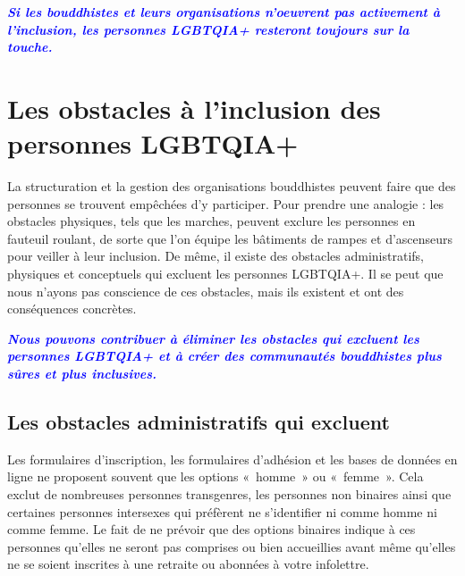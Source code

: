 \documentclass[12pt,openany]{book}
\renewenvironment{quote}{%
  \list{}{%
    \leftmargin-0.1cm   %
    \rightmargin\leftmargin
  }
  \item\relax
}
{\endlist}
\begin{document}
\begin{quote}
\centering
\doublespacing
\textit{\Large \textcolor{blue}{\textbf{Si les bouddhistes et leurs organisations n’oeuvrent pas activement à l’inclusion, les personnes \mbox{LGBTQIA+} resteront toujours sur la touche.}}}
\end{quote}

\chapter*{Les obstacles à l’inclusion des personnes \mbox{LGBTQIA+}}

La structuration et la gestion des organisations bouddhistes peuvent faire que des personnes se trouvent empêchées d’y participer. Pour prendre une analogie : les obstacles physiques, tels que les marches, peuvent exclure les personnes en fauteuil roulant, de sorte que l’on équipe les bâtiments de rampes et d’ascenseurs pour veiller à leur inclusion. De même, il existe des obstacles administratifs, physiques et conceptuels qui excluent les personnes \mbox{LGBTQIA+}. Il se peut que nous n’ayons pas conscience de ces obstacles, mais ils existent et ont des conséquences concrètes.

\begingroup
\begin{quote}
\doublespacing
\centering
\textit{\Large \textbf{\textcolor{blue}{Nous pouvons contribuer à éliminer les obstacles qui excluent les personnes \mbox{LGBTQIA+} et à créer des communautés bouddhistes plus sûres et plus inclusives.}}}
\end{quote}
\endgroup

\section*{Les obstacles administratifs qui excluent}

\noindent Les formulaires d’inscription, les formulaires d’adhésion et les bases de données en ligne ne proposent souvent que les options \mbox{« homme »} ou \mbox{« femme »}. Cela exclut de nombreuses personnes transgenres, les personnes non binaires ainsi que certaines personnes intersexes qui préfèrent ne s’identifier ni comme homme ni comme femme. Le fait de ne prévoir que des options binaires indique à ces personnes qu’elles ne seront pas comprises ou bien accueillies avant même qu’elles ne se soient inscrites à une retraite ou abonnées à votre infolettre.
\end{document}

